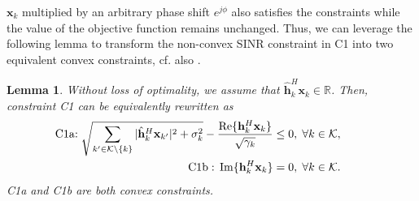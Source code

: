 \documentclass[12pt, draftclsnofoot, onecolumn]{IEEEtran}
\newtheorem{lemma}{Lemma}
\begin{document}
$\mathbf{x}_k$ multiplied by an arbitrary phase shift $e^{j\phi}$ also satisfies the constraints while the value of the objective function remains unchanged. Thus, we can leverage the following lemma to transform the non-convex SINR constraint in C1 into two equivalent convex constraints, cf. also \cite{luo2006introduction}.
\begin{lemma}
Without loss of optimality, we assume that $\hat{\mathbf{h}}_k^H\mathbf{x}_k\in\mathbb{R}$. Then, constraint C1 can be equivalently rewritten as
\vspace*{-2mm}
\begin{eqnarray}
&& \hspace*{-12mm}{{\mathrm{C1a}}}\mbox{:}\hspace*{1mm}\sqrt{\sum_{k'\in\mathcal{K}\setminus\{k\}}|\hat{\mathbf{h}}_k^H\mathbf{x}_{k'}|^2+\sigma_k^2}-\frac{\operatorname{Re}\{{\mathbf{h}}_{k}^H\mathbf{x}_k\}}{\sqrt{\gamma_k}}\leq 0, \hspace*{1mm}\forall k\in\mathcal{K},\\
&&\hspace*{-12mm}\mathrm{C1b:}\hspace*{1mm}\operatorname{Im}\{{\mathbf{h}}_{k}^H\mathbf{x}_k\}=0,\hspace*{1mm}\forall k\in\mathcal{K}.\vspace*{-2mm}
\end{eqnarray}
C1a and C1b are both convex constraints.\vspace*{-2mm}
\end{lemma}
\end{document}
